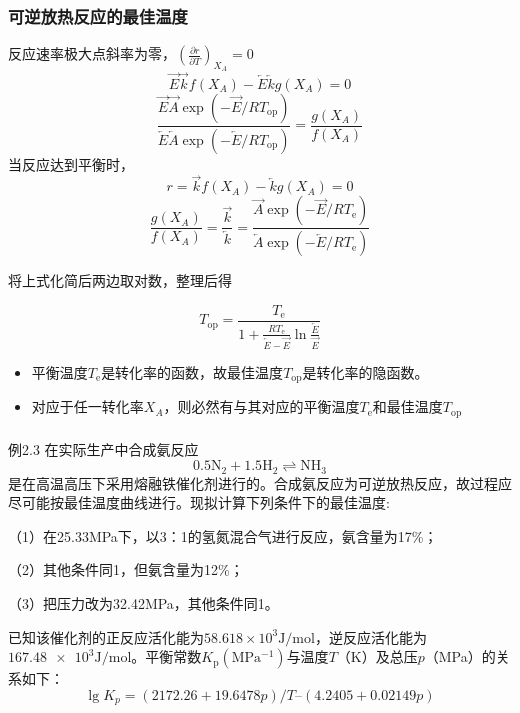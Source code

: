 \begin{frame}
	\frametitle{可逆放热反应的最佳温度}
    \begin{minipage}{0.48\linewidth}
        反应速率极大点斜率为零，$(\frac{\partial r}{\partial T} )_{X_A}= 0$
        \[
            \overrightarrow{E}\overrightarrow{k}f({X_A})-\overleftarrow{E}\overleftarrow{k}g({X_A})=0
        \]
        \[
            \frac{\overrightarrow{E}\overrightarrow{A}\exp(-\overrightarrow{E}/RT_{\mathrm{op}})}{\overleftarrow{E}\overleftarrow{A}\exp(-\overleftarrow{E}/RT_{\mathrm{op}})}=\frac{g({X_A})}{f({X_A})}
        \]
        当反应达到平衡时，
        \[
            r=\overrightarrow{k}f(X_A)-\overleftarrow{k}g(X_A)=0
        \]
        \[
            \frac{g({X_A})}{f({X_A})}=\frac{\overrightarrow{k}}{\overleftarrow{k}}=\frac{\overrightarrow{A}\exp(-\overrightarrow{E}/RT_{\mathrm{e}})}{\overleftarrow{A}\exp(-\overleftarrow{E}/RT_{\mathrm{e}})}
        \]
    \end{minipage}\hfill
    \begin{minipage}{0.48\linewidth}
        将上式化简后两边取对数，整理后得
        \begin{framed}
        \[
            T_{\mathrm{op}}=\frac{T_{\mathrm{e}}}{1+\frac{RT_{\mathrm{e}}}{\overleftarrow{E}-\overrightarrow{E}}\ln\frac{\overleftarrow{E}}{\overrightarrow{E}}}
        \]
        \end{framed}
        \begin{itemize}
            \item 平衡温度$T_{\mathrm{e}}$是转化率的函数，故最佳温度$T_{\mathrm{op}}$是转化率的隐函数。
            \item 对应于任一转化率$X_A$，则必然有与其对应的平衡温度$T_{\mathrm{e}}$和最佳温度$T_{\mathrm{op}}$
        \end{itemize}
    \end{minipage}
\end{frame}


\begin{frame}[t]
	\frametitle{}
	\begin{block}{例2.3}
		在实际生产中合成氨反应
	$$0.5\mathrm{N_2}+1.5\mathrm{H_2}\rightleftharpoons \mathrm{NH_3}$$
	是在高温高压下采用熔融铁催化剂进行的。合成氨反应为可逆放热反应，故过程应尽可能按最佳温度曲线进行。现拟计算下列条件下的最佳温度:
	
	（1）在25.33MPa下，以3：1的氢氮混合气进行反应，氨含量为17\%；
	
	（2）其他条件同1，但氨含量为12\%；
	
	（3）把压力改为32.42MPa，其他条件同1。

	已知该催化剂的正反应活化能为$58.618\times 10^3\mathrm{J/mol}$，逆反应活化能为$\num{167.48e3}\mathrm{J/mol}$。平衡常数$K_\mathrm{p}\mathrm{(MPa^{-1})}$与温度$T$（K）及总压$p$（MPa）的关系如下：
    \[
        \lg{K_p}=(2172.26 + 19.6478p)/T – (4.2405 + 0.02149p)
    \]
	\end{block}
\end{frame}


